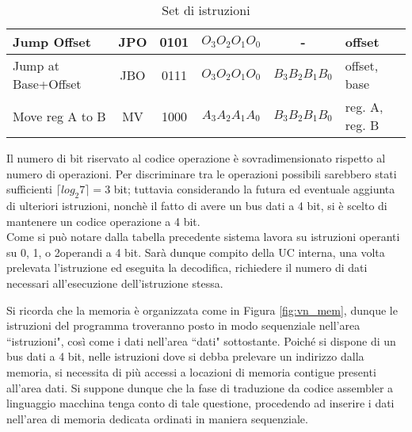 \begin{table}[H]
\begin{tabular}{|p{0.5cm}|p{0.5cm}|p{0.5cm}|p{0.5cm}|p{0.5cm}|p{0.5cm}|}
		\multicolumn{1}{|l|}{Jump Offset}	&
		\multicolumn{1}{|c|}{JPO}  &
		\multicolumn{1}{|c|}{0101}	&
		\multicolumn{1}{|c|}{$O_3O_2O_1O_0$} &
		\multicolumn{1}{|c|}{-} &
		\multicolumn{1}{|l|}{offset}	\\ \hline
		
		\multicolumn{1}{|l|}{Jump at Base+Offset}	&
		\multicolumn{1}{|c|}{JBO}  &
		\multicolumn{1}{|c|}{0111}	&
		\multicolumn{1}{|c|}{$O_3O_2O_1O_0$} &
		\multicolumn{1}{|c|}{$B_3B_2B_1B_0$} &
		\multicolumn{1}{|l|}{offset, base}	\\ \hline
		
		\multicolumn{1}{|l|}{Move reg A to B}	&
		\multicolumn{1}{|c|}{MV}  &
		\multicolumn{1}{|c|}{1000}	&
		\multicolumn{1}{|c|}{$A_3A_2A_1A_0$} &
		\multicolumn{1}{|c|}{$B_3B_2B_1B_0$} &
		\multicolumn{1}{|l|}{reg. A, reg. B}	\\ \hline
	\end{tabular}
	\caption{Set di istruzioni}
\end{table} 		
\noindent
Il numero di bit riservato al codice operazione è sovradimensionato rispetto al numero di operazioni. Per discriminare tra le operazioni possibili sarebbero stati sufficienti $\lceil log_2{7} \rceil = 3$ bit; tuttavia considerando la futura ed eventuale aggiunta di ulteriori istruzioni, nonchè il fatto di avere un bus dati a 4 bit, si è scelto di mantenere un codice operazione a 4 bit.\\
Come si può notare dalla tabella precedente sistema lavora su istruzioni operanti su 0, 1, o 2operandi a 4 bit. Sarà dunque compito della UC interna, una volta prelevata l'istruzione ed eseguita la decodifica, richiedere il numero di dati necessari all'esecuzione dell'istruzione stessa.
\par \bigskip \noindent
Si ricorda che la memoria è organizzata come in Figura \ref{fig:vn_mem}, dunque le istruzioni del programma troveranno posto in modo sequenziale nell'area \textquotedblleft istruzioni", così come i dati nell'area \textquotedblleft dati" sottostante. 
Poiché si dispone di un bus dati a 4 bit, nelle istruzioni dove si debba prelevare un indirizzo dalla memoria, si necessita di più accessi a locazioni di memoria contigue presenti all'area dati.
Si suppone dunque che la fase di traduzione da codice assembler a linguaggio macchina tenga conto di tale questione, procedendo ad inserire i dati nell'area di memoria dedicata ordinati in maniera sequenziale.

